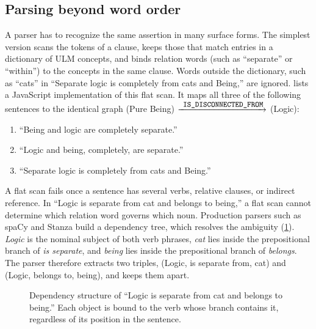 \documentclass[twocolumn]{ulpaper}
\newcommand{\rel}[1]{\texttt{\small #1}}
\begin{document}
\subsection{Parsing beyond word order}
\label{sec:parsing}

A parser has to recognize the same assertion in many surface forms. The simplest version scans the tokens of a clause, keeps those that match entries in a dictionary of ULM concepts, and binds relation words (such as ``separate'' or ``within'') to the concepts in the same clause. Words outside the dictionary, such as ``cats'' in ``Separate logic is completely from cats and Being,'' are ignored.  lists a JavaScript implementation of this flat scan. It maps all three of the following sentences to the identical graph (Pure Being) $\xrightarrow{\rel{IS\_DISCONNECTED\_FROM}}$ (Logic):
\begin{enumerate}
  \item ``Being and logic are completely separate.''
  \item ``Logic and being, completely, are separate.''
  \item ``Separate logic is completely from cats and Being.''
\end{enumerate}

A flat scan fails once a sentence has several verbs, relative clauses, or indirect reference. In ``Logic is separate from cat and belongs to being,'' a flat scan cannot determine which relation word governs which noun. Production parsers such as spaCy \citep{honnibal2020spacy} and Stanza \citep{qi2020stanza} build a dependency tree, which resolves the ambiguity (\cref{fig:deptree}). \emph{Logic} is the nominal subject of both verb phrases, \emph{cat} lies inside the prepositional branch of \emph{is separate}, and \emph{being} lies inside the prepositional branch of \emph{belongs}. The parser therefore extracts two triples, (Logic, is separate from, cat) and (Logic, belongs to, being), and keeps them apart.

\begin{figure}[t]
\centering
{}
\caption{Dependency structure of ``Logic is separate from cat and belongs to being.'' Each object is bound to the verb whose branch contains it, regardless of its position in the sentence.}
\label{fig:deptree}
\end{figure}
\end{document}
